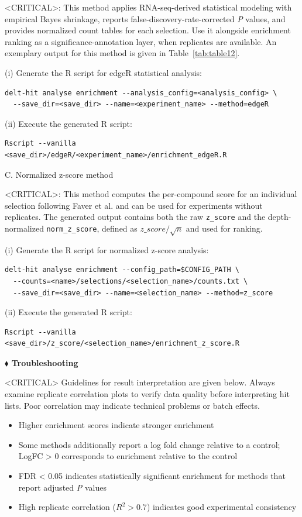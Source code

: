 \documentclass[pdflatex,sn-nature]{sn-jnl}
\begin{document}
<CRITICAL>: This method applies RNA-seq-derived statistical modeling with empirical Bayes shrinkage, reports false-discovery-rate-corrected \textit{P} values, and provides normalized count tables for each selection. Use it alongside enrichment ranking as a significance-annotation layer, when replicates are available. An exemplary output for this method is given in Table~\ref{tab:table12}.

(i) Generate the R script for edgeR statistical analysis:
\begin{lstlisting}
delt-hit analyse enrichment --analysis_config=<analysis_config> \
  --save_dir=<save_dir> --name=<experiment_name> --method=edgeR
\end{lstlisting}

(ii) Execute the generated R script:
\begin{lstlisting}
Rscript --vanilla <save_dir>/edgeR/<experiment_name>/enrichment_edgeR.R
\end{lstlisting}


C. Normalized z-score method

<CRITICAL>: This method computes the per-compound score for an individual selection following Faver et al.\cite{faver_quantitativecomparisonenrichment_2019} and can be used for experiments without replicates. The generated output contains both the raw \texttt{z\_score} and the depth-normalized \texttt{norm\_z\_score}, defined as $z\_score / \sqrt{n}$ and used for ranking. 

(i) Generate the R script for normalized z-score analysis:
\begin{lstlisting}
delt-hit analyse enrichment --config_path=$CONFIG_PATH \
  --counts=<name>/selections/<selection_name>/counts.txt \
  --save_dir=<save_dir> --name=<selection_name> --method=z_score
\end{lstlisting}

(ii) Execute the generated R script:
\begin{lstlisting}
Rscript --vanilla <save_dir>/z_score/<selection_name>/enrichment_z_score.R
\end{lstlisting}


\textbf{$\blacklozenge$ Troubleshooting}


<CRITICAL> Guidelines for result interpretation are given below. Always examine replicate correlation plots to verify data quality before interpreting hit lists. Poor correlation may indicate technical problems or batch effects. 

\begin{itemize}
  \item Higher enrichment scores indicate stronger enrichment
  \item Some methods additionally report a log fold change relative to a control; LogFC \textgreater{} 0 corresponds to enrichment relative to the control
  \item FDR \textless{} 0.05 indicates statistically significant enrichment for methods that report adjusted \textit{P} values
  \item High replicate correlation ($R^2 > 0.7$) indicates good experimental consistency
\end{itemize}
\end{document}
